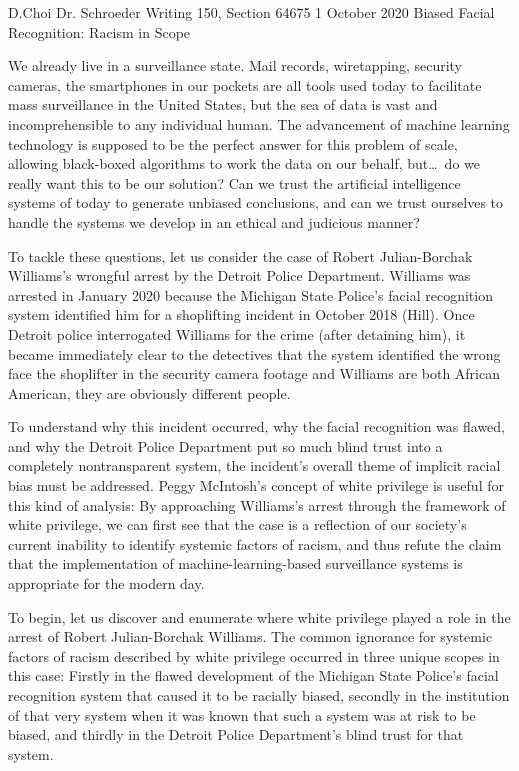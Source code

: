 \documentclass[12pt, letterpaper]{article}
\begin{document}
\begin{mla}
	{D.}{Choi}
	{Dr. Schroeder}
	{Writing 150, Section 64675}
	{1 October 2020}
	{Biased Facial Recognition: Racism in Scope}


We already live in a surveillance state. Mail records, wiretapping, security
cameras, the smartphones in our pockets are all tools used
today to facilitate mass surveillance in the United States, but the sea of
data is vast and incomprehensible to any individual human. The advancement of
machine learning technology is supposed to be the perfect answer for this
problem of scale, allowing black-boxed algorithms to work the data on our
behalf, but\ldots\ do we really want this to be our solution? Can we trust
the artificial intelligence systems of today to generate unbiased conclusions,
and can we trust ourselves to handle the systems we develop in an ethical
and judicious manner?

To tackle these questions, let us consider the case of
Robert Julian-Borchak Williams's wrongful arrest by the Detroit Police
Department. Williams was arrested in January 2020 because the Michigan State
Police's facial recognition system identified him for a shoplifting incident
in October 2018 (Hill). Once Detroit police interrogated Williams for the crime
(after detaining him), it became immediately clear to the detectives that the
system identified the wrong face the shoplifter in the
security camera footage and Williams are both African American, they are
obviously different people.

To understand why this incident occurred, why the facial recognition was
flawed, and why the Detroit Police Department put so much blind trust into a
completely nontransparent system, the incident's overall theme of implicit
racial bias must be addressed. Peggy McIntosh's concept of white privilege is
useful for this kind of analysis: By approaching Williams's arrest through the
framework of white privilege, we can first see that the case is a reflection
of our society's current inability to identify systemic factors of racism, and
thus refute the claim that the implementation of machine-learning-based
surveillance systems is appropriate for the modern day.

To begin, let us discover and enumerate where white privilege played a role in
the arrest of Robert Julian-Borchak Williams. The common ignorance for
systemic factors of racism described by white privilege occurred in three
unique scopes in this case: Firstly in the flawed development of the Michigan
State Police's facial recognition system that caused it to be racially biased,
secondly in the institution of that very system when it was known that such a
system was at risk to be biased, and thirdly in the Detroit Police
Department's blind trust for that system.


\end{mla}
\end{document}
